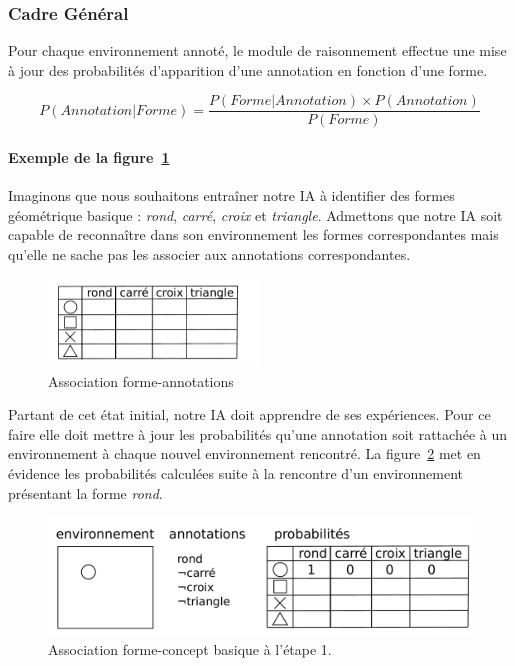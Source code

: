 \subsubsection{Cadre Général}

Pour chaque environnement annoté, le module de raisonnement effectue une mise à jour des probabilités d'apparition d'une annotation en fonction d'une forme.

\[ P(Annotation|Forme) = \frac{P(Forme|Annotation) \times P(Annotation)}{P(Forme)} \]

\paragraph{Exemple de la figure~\ref{img_annotations}}
Imaginons que nous souhaitons entraîner notre IA à identifier des formes géométrique basique : \emph{rond}, \emph{carré}, \emph{croix} et \emph{triangle}. Admettons que notre IA soit capable de reconnaître dans son environnement les formes correspondantes mais qu'elle ne sache pas les associer aux annotations correspondantes.

\begin{figure}[H] 
\centering
    \includegraphics[width=0.5\textwidth]{files/raisonneur/annotations} 
\caption{Association forme-annotations} 
\label{img_annotations}
\end{figure}

Partant de cet état initial, notre IA doit apprendre de ses expériences. Pour ce faire elle doit mettre à jour les probabilités qu'une annotation soit rattachée à un environnement à chaque nouvel environnement rencontré. La figure~\ref{img_annotations_1} met en évidence les probabilités calculées suite à la rencontre d'un environnement présentant la forme \emph{rond}.

\begin{figure}[H] 
\centering
\includegraphics[width=\textwidth]{files/raisonneur/annotations_1} 
\caption{Association forme-concept basique à l'étape 1.} 
\label{img_annotations_1}
\end{figure}

